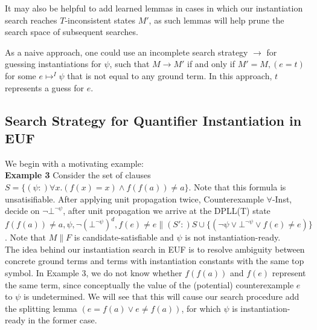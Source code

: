 \documentclass{llncs}
\begin{document}
It may also be helpful to add learned lemmas in cases in which our instantiation search reaches $T$-inconsistent states $M'$, as such lemmas will help prune the search space of subsequent searches.

As a naive approach, one could use an incomplete search strategy $\rightarrow$ for guessing instantiations for $\psi$, such that $M \rightarrow M'$ if and only if $M' = M, (e = t)$ for some $e \mapsto^I \psi$ that is not equal to any ground term.
In this approach, $t$ represents a guess for $e$.



\subsection{Search Strategy for Quantifier Instantiation in EUF}

We begin with a motivating example: \\

{\bf Example 3}
Consider the set of clauses $S = \{ (\psi :)\forall x. (f( x ) = x) \wedge f( f( a ) ) \neq a \}$.  Note that this formula is unsatisifiable.
After applying unit propagation twice, Counterexample $\forall$-Inst, decide on $\neg \bot^{\neg \psi}$, after unit propagation we arrive at the DPLL(T) state $f( f( a ) ) \neq a, \psi, \neg (\bot^{\neg \psi})^d, f(e) \neq e \parallel (S':)S \cup \{ ( \neg \psi \vee \bot^{\neg \psi } \vee f( e ) \neq e ) \}$.
Note that $M \parallel F$ is candidate-satisfiable and $\psi$ is not instantiation-ready. \\

The idea behind our instantiation search in EUF is to resolve ambiguity between concrete ground terms and terms with instantiation constants with the same top symbol.
In Example 3, we do not know whether $f( f( a ) )$ and $f( e )$ represent the same term, since conceptually the value of the (potential) counterexample $e$ to $\psi$ is undetermined.
We will see that this will cause our search procedure add the splitting lemma $( e = f( a ) \vee e \neq f( a ) )$, for which $\psi$ is instantiation-ready in the former case.
\end{document}
